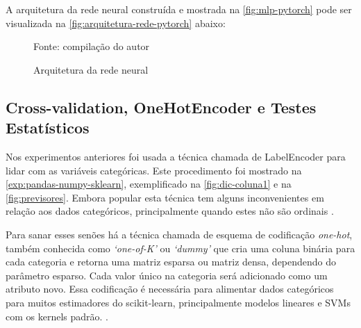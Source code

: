 A arquitetura da rede neural construída e mostrada na \autoref{fig:mlp-pytorch} pode ser visualizada na \autoref{fig:arquitetura-rede-pytorch} abaixo:

\begin{figure}[H]
	\centering
	\caption{Arquitetura da rede neural}
	
	\label{fig:arquitetura-rede-pytorch}
	{\scriptsize Fonte: compilação do autor}
\end{figure}

\subsection{Cross-validation, OneHotEncoder e Testes Estatísticos}\label{exo:cross-validation}
Nos experimentos anteriores foi usada a técnica chamada de LabelEncoder para lidar com as variáveis categóricas. Este procedimento foi mostrado na \autoref{exp:pandas-numpy-sklearn}, exemplificado na \autoref{fig:dic-coluna1} e na \autoref{fig:previsores}. Embora popular esta técnica tem alguns inconvenientes em relação aos dados categóricos, principalmente quando estes não são ordinais \cite{shen_learning_2019}.

Para sanar esses senões há a técnica chamada de esquema de codificação \textit{one-hot}, também conhecida como \textit{`one-of-K'} ou \textit{`dummy'} que cria uma coluna binária para cada categoria e retorna uma matriz esparsa ou matriz densa, dependendo do parâmetro esparso. Cada valor único na categoria será adicionado como um atributo novo. Essa codificação é necessária para alimentar dados categóricos para muitos estimadores do scikit-learn, principalmente modelos lineares e SVMs com os kernels padrão. \cite{scikit-learn} \cite{shen_learning_2019}.

